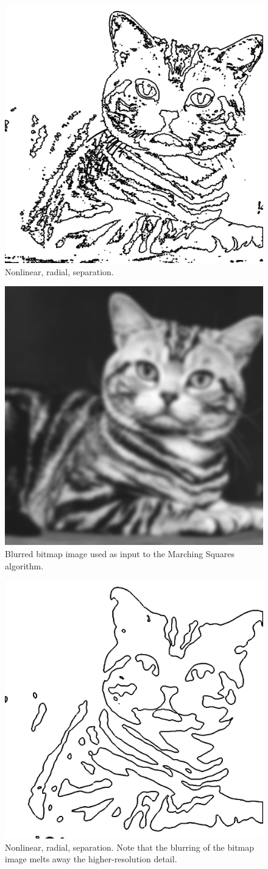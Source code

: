 \documentclass[12pt]{article}
\begin{document}
\begin{figure} 
\centering
  \includegraphics[width = 3 in]{cat_isosurface.png}
  \caption{Nonlinear, radial, separation.
}
\end{figure}


\begin{figure} 
\centering
  \includegraphics[width = 3 in]{cat_blurred_image.png}
  \caption{Blurred bitmap image used as input to the Marching Squares algorithm.
}
\end{figure}


\begin{figure} 
\centering
  \includegraphics[width = 3 in]{cat_blurred_isosurface.png}
  \caption{Nonlinear, radial, separation.
Note that the blurring of the bitmap image melts away the higher-resolution detail.
}
\end{figure}
\end{document}
